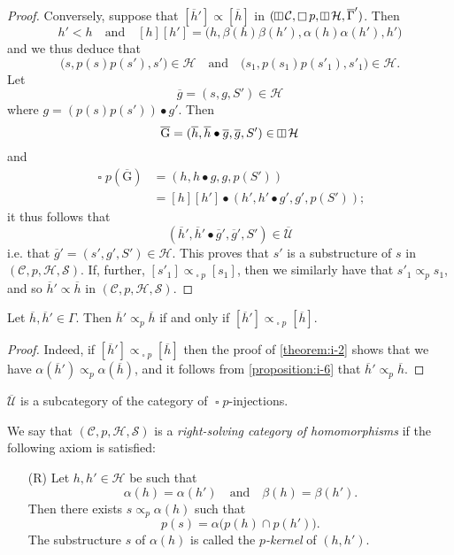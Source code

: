 \documentclass[a4paper,fleqn]{article}
\theoremstyle{plain}
\newenvironment{corollary}[1]
  {\renewcommand\theinnercorollary{#1}\innercorollary}
  {\endinnercorollary}
\theoremstyle{definition}
\newenvironment{definition}[1]
  {\renewcommand\theinnerdefinition{#1}\innerdefinition}
  {\endinnerdefinition}
\newcommand{\oldpage}[1]{{\marginpar{\footnotesize$\bigg\vert$\,\,\,\,\textit{p.~#1}}}}
\newcommand{\textand}{\quad\text{and}\quad}
\newcommand{\CC}{\mathcal{C}}
\newcommand{\HH}{\mathcal{H}}
\renewcommand{\SS}{\mathcal{S}}
\newcommand{\UU}{\mathcal{U}}
\newcommand{\subs}{\mathrel{\propto}}
\newcommand{\vsqbox}{{\rotatebox{90}{$\boxminus$}}}
\DeclareMathOperator{\sq}{\square}
\DeclareMathOperator{\vsq}{\raisebox{-.1em}{$\vsqbox$}}
\newcommand{\smallbullet}{\bullet}
\begin{document}
\begin{proof}
  Conversely, suppose that $[\overline{h}']\subs[\overline{h}]$ in $(\vsq\CC,\sq p,\vsq\HH,\overline{\Gamma}')$.
  Then
  \[
    h'<h
    \textand
    [h][h'] = \big(
      h, \beta(h)\beta(h'), \alpha(h)\alpha(h'), h'
    \big)
  \]
  \oldpage{369}
  and we thus deduce that
  \[
    \big( s, p(s)p(s'), s' \big)\in\HH
    \textand
    \big( s_1, p(s_1)p(s'_1), s'_1 \big)\in\HH.
  \]
  Let
  \[
    \overline{g}
    = (s,g,S')\in\HH
  \]
  where $g=(p(s)p(s'))\smallbullet g'$.
  Then
  \[
    \overline{\mathrm{G}}
    = (\overline{h},\overline{h}\smallbullet\overline{g},\overline{g},S')
    \in\vsq\HH
  \]
  and
  \[
    \begin{aligned}
      \sq p(\overline{\mathrm{G}})
      &= (h,h\smallbullet g,g,p(S'))
    \\&= [h][h']\smallbullet(h',h'\smallbullet g',g',p(S'));
    \end{aligned}
  \]
  it thus follows that
  \[
    (\overline{h}',\overline{h}'\smallbullet\overline{g}',\overline{g}',S')\in\overline{\UU}
  \]
  i.e. that $\overline{g}'=(s',g',S')\in\HH$.
  This proves that $s'$ is a substructure of $s$ in $(\CC,p,\HH,\SS)$.
  If, further, $[s'_1]\subs_{\sq p}[s_1]$, then we similarly have that $s'_1\subs_p s_1$, and so $\overline{h}'\subs\overline{h}$ in $(\CC,p,\HH,\SS)$.
\end{proof}

\begin{corollary}{1}
  Let $\overline{h},\overline{h}'\in\Gamma$.
  Then $\overline{h}'\subs_p\overline{h}$ if and only if $[\overline{h}']\subs_{\sq p}[\overline{h}]$.
\end{corollary}

\begin{proof}
  Indeed, if $[\overline{h}']\subs_{\sq p}[\overline{h}]$ then the proof of \cref{theorem:i-2} shows that we have $\alpha(\overline{h}')\subs_p\alpha(\overline{h})$, and it follows from \cref{proposition:i-6} that $\overline{h}'\subs_p\overline{h}$.
\end{proof}

\begin{corollary}{2}
  $\overline{\UU}$ is a subcategory of the category of $\sq p$-injections.
\end{corollary}

\begin{definition}{9}
\label{definition:i-9}
  We say that $(\CC,p,\HH,\SS)$ is a \emph{right-solving category of homomorphisms} if the following axiom is satisfied:
  \begin{enumerate}
    \item[\normalfont(R)] Let $h,h'\in\HH$ be such that
      \[
        \alpha(h)=\alpha(h')
        \textand
        \beta(h)=\beta(h').
      \]
      Then there exists $s\subs_p\alpha(h)$ such that
      \[
        p(s)
        = \alpha\big(
          p(h)\cap p(h')
        \big).
      \]
      The substructure $s$ of $\alpha(h)$ is called the \emph{$p$-kernel} of $(h,h')$.
  \end{enumerate}
\end{definition}
\end{document}

